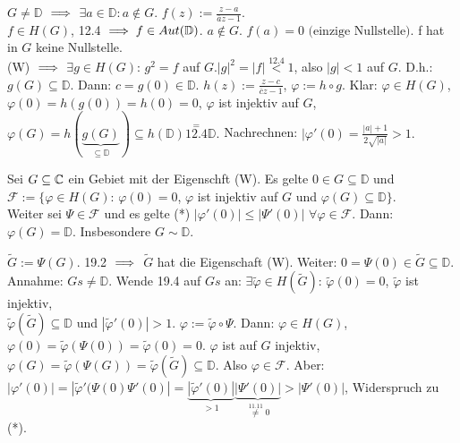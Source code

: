\documentclass[a4paper,twoside,DIV15,BCOR12mm]{scrbook}
\def\MdD{\mathbb{D}}
\def\Gs{\ensuremath{\widetilde{G}}}
\def\phis{\ensuremath{\widetilde{\varphi}}}
\begin{document}
\begin{beweis}
   $G\ne\MdD$ $\implies$ $\exists a\in \MdD: a\not\in G$. $f(z):=\frac{z-a}{\overline{a}z-1}$.\\
   $f\in H(G)$, 12.4 $\folgt f\in Aut(\MdD)$. $a\not\in G$. $f(a)=0\text{ (einzige Nullstelle)}$. f hat in $G$ keine Nullstelle. \\ 
   (W) $\implies$ $\exists g \in H(G)$: $g^2 = f$ auf $G$.$|g|^2 = |f| \stackrel{\text{12.4}}{<} 1$, also $|g| < 1$ auf $G$. D.h.: $g(G)\subseteq\MdD$. 
   Dann: $c=g(0) \in \MdD$. $h(z):=\frac{z-c}{\overline{c}z-1}$, $\varphi:= h\circ g$. Klar: $\varphi \in H(G)$, $\varphi(0)=h(g(0))=h(0)=0$, $\varphi$ ist injektiv auf $G$, $\varphi(G) = h(\underbrace{g(G)}_{\subseteq \MdD}) \subseteq h(\MdD) \stackrel{=}{12.4} \MdD.$ Nachrechnen: $| \varphi'(0) = \frac{|a|+1}{2\sqrt{|a|}} > 1.$
\end{beweis}


\begin{lemma}
  Sei $G\subseteq\mathbb{C}$ ein Gebiet mit der Eigenschft (W). Es gelte $0 \in G \subseteq \MdD$ und $\mathcal{F}:=\{\varphi\in H(G)$: $\varphi(0)=0$, $\varphi$ ist injektiv auf $G$ und $\varphi(G)\subseteq\MdD\}$.\\
  Weiter sei $\Psi \in \mathcal{F}$ und es gelte (*) $|\varphi'(0)|\le|\Psi'(0)|$ $\forall\varphi\in\mathcal{F}$. Dann: $\varphi(G)=\MdD$. Insbesondere $G \sim \MdD$.
\end{lemma}
\begin{beweis}
  $\Gs:=\Psi(G)$. 19.2 $\implies$ $\Gs$ hat die Eigenschaft (W). Weiter: $0=\Psi(0)\in\Gs\subseteq\MdD$. \\

  Annahme: $Gs\ne\MdD$. Wende 19.4 auf $Gs$ an: $\exists \phis\in H(\Gs)$: $\phis(0)=0$, $\phis$ ist injektiv, \\
  $\phis(\Gs)\subseteq\MdD$ und $|\phis'(0)|>1$. $\varphi:=\phis\circ\Psi$. Dann: $\varphi\in H(G)$, $\varphi(0)=\phis(\Psi(0))=\phis(0)=0$. 
  $\varphi $ ist auf $G$ injektiv, $\varphi(G)=\phis(\Psi(G))=\phis(\Gs)\subseteq\MdD$. Also $\varphi\in\mathcal{F}$. Aber: \\
  $|\varphi'(0)|=|\phis'(\Psi(0)\Psi'(0)|=\underbrace{|\phis'(0)|}_{>1} \underbrace{|\Psi'(0)|}_{\stackrel{11.11}{\ne} 0}>|\Psi'(0)|$, Widerspruch zu (*).
\end{beweis}
\end{document}
